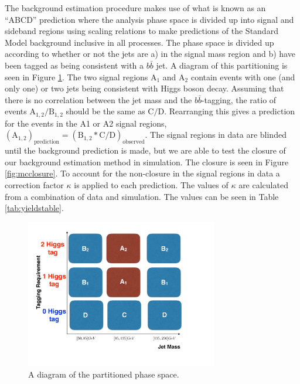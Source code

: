 The background estimation procedure makes use of what is known as an ``ABCD'' prediction where the analysis phase space is divided up into signal and sideband regions using scaling relations to make predictions of the Standard Model background inclusive in all processes. The phase space is divided up according to whether or not the jets are a) in the signal mass region and b) have been tagged as being consistent with a $b\bar{b}$ jet. A diagram of this partitioning is seen in Figure \ref{fig:abcd}. The two signal regions $\mathrm{A}_{1}$ and $\mathrm{A}_{2}$ contain events with one (and only one) or two jets being consistent with Higgs boson decay. Assuming that there is no correlation between the jet mass and the $b\bar{b}$-tagging, the ratio of events $\mathrm{A}_{1, 2} / \mathrm{B}_{1, 2}$ should be the same as $\mathrm{C} / \mathrm{D}$. Rearranging this gives a prediction for the events in the A1 or A2 signal regions, $\left(\mathrm{A}_{1, 2}\right)_{\mathrm{prediction}} = \left(\mathrm{B}_{1, 2} * \mathrm{C} / \mathrm{D}\right)_{\mathrm{observed}}$. The signal regions in data are blinded until the background prediction is made, but we are able to test the closure of our background estimation method in simulation. The closure is seen in Figure \ref{fig:mcclosure}. To account for the non-closure in the signal regions in data a correction factor $\kappa$ is applied to each prediction. The values of $\kappa$ are calculated from a combination of data and simulation. The values can be seen in Table \ref{tab:yieldstable}.

\begin{figure}[htbp]
\centering
\includegraphics[width=0.75\textwidth]{figs/CMS-SUS-17-006_Figure-aux_002.pdf}
\caption{A diagram of the partitioned phase space.}
\label{fig:abcd}
\end{figure}

